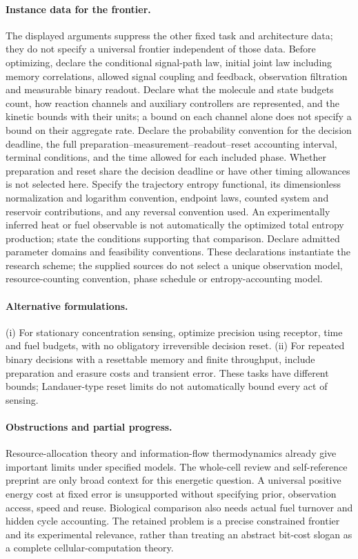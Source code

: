 \documentclass[11pt]{article}
\begin{document}
\paragraph{Instance data for the frontier.} The displayed arguments suppress the other fixed task and architecture data; they do not specify a universal frontier independent of those data. Before optimizing, declare the conditional signal-path law, initial joint law including memory correlations, allowed signal coupling and feedback, observation filtration and measurable binary readout. Declare what the molecule and state budgets count, how reaction channels and auxiliary controllers are represented, and the kinetic bounds with their units; a bound on each channel alone does not specify a bound on their aggregate rate. Declare the probability convention for the decision deadline, the full preparation--measurement--readout--reset accounting interval, terminal conditions, and the time allowed for each included phase. Whether preparation and reset share the decision deadline or have other timing allowances is not selected here. Specify the trajectory entropy functional, its dimensionless normalization and logarithm convention, endpoint laws, counted system and reservoir contributions, and any reversal convention used. An experimentally inferred heat or fuel observable is not automatically the optimized total entropy production; state the conditions supporting that comparison. Declare admitted parameter domains and feasibility conventions. These declarations instantiate the research scheme; the supplied sources do not select a unique observation model, resource-counting convention, phase schedule or entropy-accounting model.

\paragraph{Alternative formulations.} (i) For stationary concentration sensing, optimize precision using receptor, time and fuel budgets, with no obligatory irreversible decision reset. (ii) For repeated binary decisions with a resettable memory and finite throughput, include preparation and erasure costs and transient error. These tasks have different bounds; Landauer-type reset limits do not automatically bound every act of sensing.
\paragraph{Obstructions and partial progress.} Resource-allocation theory and information-flow thermodynamics already give important limits under specified models. The whole-cell review and self-reference preprint are only broad context for this energetic question. A universal positive energy cost at fixed error is unsupported without specifying prior, observation access, speed and reuse. Biological comparison also needs actual fuel turnover and hidden cycle accounting. The retained problem is a precise constrained frontier and its experimental relevance, rather than treating an abstract bit-cost slogan as a complete cellular-computation theory.
\end{document}
